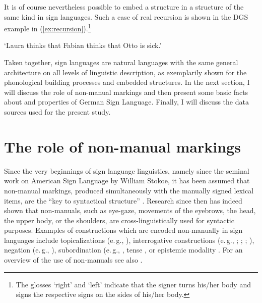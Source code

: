 \noindent It is of course nevertheless possible to embed a structure in a structure of the same kind in sign languages. Such a case of real recursion is shown in the DGS example in (\ref{ex:recursion}).\footnote{ The glosses `right' and `left' indicate that the signer turns his/her body and signs the respective signs on the sides of his/her body.}

\begin{exe}
\ex {}  
\glt `Laura thinks that Fabian thinks that Otto is sick.' \label{ex:recursion}
\end{exe} 

\noindent Taken together, sign languages are natural languages with the same general architecture on all levels of linguistic description, as exemplarily shown for the phonological building processes and embedded structures. In the next section, I will discuss the role of non-manual markings and then present some basic facts about and properties of German Sign Language. Finally, I will discuss the data sources used for the present study.

\section{The role of non-manual markings}\label{sectionnmms}
Since the very beginnings of sign language linguistics, namely since the seminal work on American Sign Language by William Stokoe, it has been assumed that non-manual markings, produced simultaneously with the manually signed lexical items, are the ``key to syntactical structure'' \citep[63]{stokoe1960sign}. Research since then has indeed shown that non-manuals, such as eye-gaze, movements of the eyebrows, the head, the upper body, or the shoulders, are cross-linguistically used for syntactic purposes. Examples of constructions which are encoded non-manually in sign languages include topicalizations (e.\,g., \citealt{aarons1994aspects, aarons1996topics,brunelli2011antisymmetry}), interrogative constructions (e.\,g., \citealt{neidle2000syntax}; \citealt{zeshan2004interrogative}; \citealt{zeshan2006negative}; \citealt{brunelli2011antisymmetry}), negation (e.\,g., \citealt{pfau2002applying, roland2002v, zeshan2004negation, zeshan2006negative}), subordination (e.\,g., \citealt{wilbur1999syntactic, pfau2005relative, cecchetto2006strategies, branchini2009relatively}, tense \citep{zucchi2009along}, or epistemic modality \citep{bross2017scope}. For an overview of the use of non-manuals see also \citet{pfauquer2010nonmanuals}.

